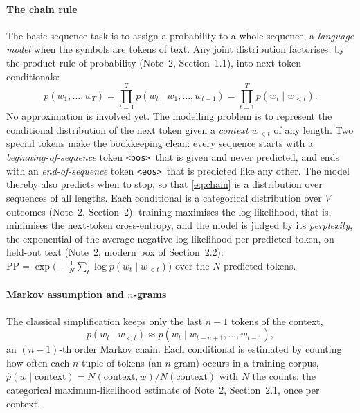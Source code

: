 \documentclass[11pt]{article}
\newcommand{\bos}{\texttt{<bos>}}
\newcommand{\eos}{\texttt{<eos>}}
\begin{document}
\paragraph{The chain rule} The basic sequence task is to assign a probability to a whole sequence, a \emph{language
model} when the symbols are tokens of text. Any joint distribution factorises, by the product rule of probability
(Note~2, Section~1.1), into next-token conditionals:
\begin{equation}\label{eq:chain}
  p(w_1, \dots, w_T) = \prod_{t=1}^{T} p(w_t \mid w_1, \dots, w_{t-1}) = \prod_{t=1}^{T} p(w_t \mid w_{<t}) .
\end{equation}
No approximation is involved yet. The modelling problem is to represent the conditional distribution of the next token
given a \emph{context} $w_{<t}$ of any length. Two special tokens make the bookkeeping clean: every sequence starts with a
\emph{beginning-of-sequence} token \bos\ that is given and never predicted, and ends with an \emph{end-of-sequence}
token \eos\ that is predicted like any other. The model thereby also predicts when to stop, so that
\eqref{eq:chain} is a distribution over sequences of all lengths. Each conditional is a categorical distribution
over $V$ outcomes (Note~2, Section~2): training maximises the log-likelihood, that is, minimises the next-token
cross-entropy, and the model is judged by its \emph{perplexity}, the exponential of the average negative log-likelihood
per predicted token, on held-out text (Note~2, modern box of Section~2.2):
$\mathrm{PP} = \exp\big(-\frac1N\sum_{t}\log p(w_t \mid w_{<t})\big)$ over the $N$ predicted tokens.

\paragraph{Markov assumption and $n$-grams} The classical simplification keeps only the last $n - 1$ tokens of the
context,
\begin{equation}\label{eq:markov}
  p(w_t \mid w_{<t}) \approx p(w_t \mid w_{t-n+1}, \dots, w_{t-1}) ,
\end{equation}
an $(n - 1)$-th order Markov chain. Each conditional is estimated by counting how often each $n$-tuple of tokens (an
$n$-gram) occurs in a training corpus, $\hat p(w \mid \text{context}) = N(\text{context}, w)/N(\text{context})$ with $N$
the counts: the categorical maximum-likelihood estimate of Note~2, Section~2.1, once per context.
\end{document}
